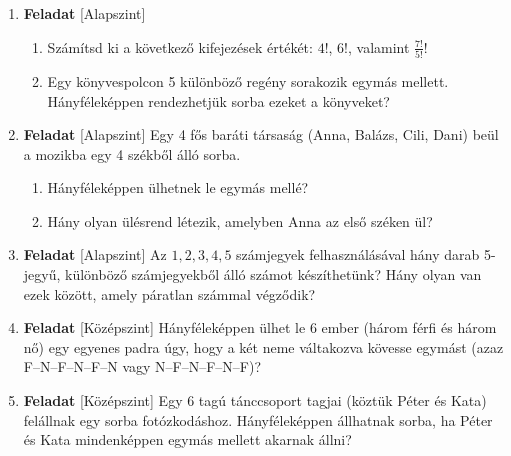 \documentclass[12pt,a4paper]{article}
\begin{document}
\begin{enumerate}[leftmargin=*]
    
    \item \textbf{Feladat} \textsf{\small [Alapszint]}
    \begin{enumerate}[label=\alph*)]
        \item Számítsd ki a következő kifejezések értékét: $4!$, $6!$, valamint $\frac{7!}{5!}$!
        \item Egy könyvespolcon 5 különböző regény sorakozik egymás mellett. Hányféleképpen rendezhetjük sorba ezeket a könyveket?
    \end{enumerate}

    \vspace{0.3cm}

    \item \textbf{Feladat} \textsf{\small [Alapszint]}
    Egy 4 fős baráti társaság (Anna, Balázs, Cili, Dani) beül a mozikba egy 4 székből álló sorba.
    \begin{enumerate}[label=\alph*)]
        \item Hányféleképpen ülhetnek le egymás mellé?
        \item Hány olyan ülésrend létezik, amelyben Anna az első széken ül?
    \end{enumerate}

    \vspace{0.3cm}

    \item \textbf{Feladat} \textsf{\small [Alapszint]}
    Az $1, 2, 3, 4, 5$ számjegyek felhasználásával hány darab 5-jegyű, különböző számjegyekből álló számot készíthetünk? Hány olyan van ezek között, amely páratlan számmal végződik?

    \vspace{0.3cm}

    \item \textbf{Feladat} \textsf{\small [Középszint]}
    Hányféleképpen ülhet le 6 ember (három férfi és három nő) egy egyenes padra úgy, hogy a két neme váltakozva kövesse egymást (azaz F--N--F--N--F--N vagy N--F--N--F--N--F)?

    \vspace{0.3cm}

    \item \textbf{Feladat} \textsf{\small [Középszint]}
    Egy 6 tagú tánccsoport tagjai (köztük Péter és Kata) felállnak egy sorba fotózkodáshoz. Hányféleképpen állhatnak sorba, ha Péter és Kata mindenképpen egymás mellett akarnak állni?


\end{enumerate}
\end{document}

